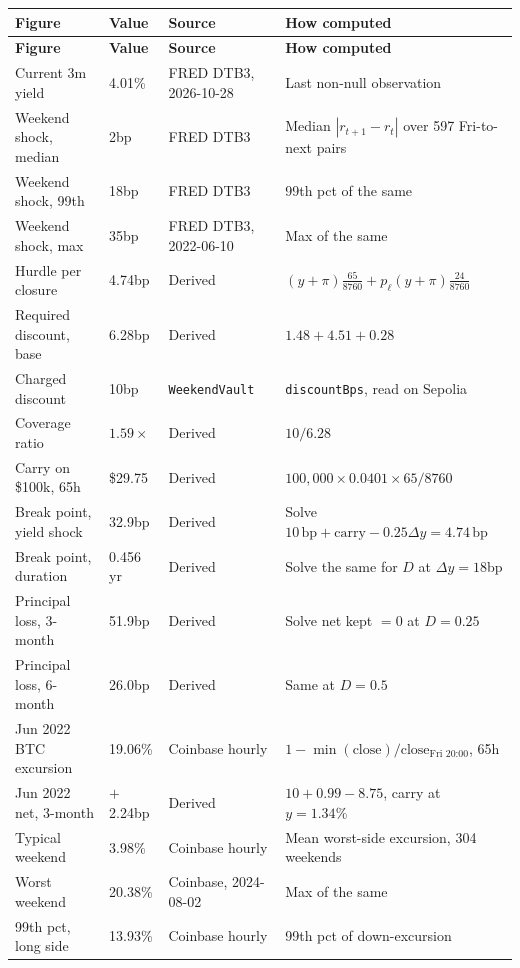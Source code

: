 \documentclass[11pt,a4paper]{article}
\newcommand{\bp}{\,\text{bp}}
\begin{document}
\begin{center}
\footnotesize
\begin{longtable}{@{}p{4.4cm}p{1.8cm}p{3.1cm}p{5.4cm}@{}}
\toprule
\textbf{Figure} & \textbf{Value} & \textbf{Source} & \textbf{How computed} \\
\midrule
\endfirsthead
\toprule
\textbf{Figure} & \textbf{Value} & \textbf{Source} & \textbf{How computed} \\
\midrule
\endhead
Current 3m yield & 4.01\% & FRED DTB3, 2026-10-28 & Last non-null observation \\
Weekend shock, median & 2bp & FRED DTB3 & Median $|r_{t+1}-r_t|$ over 597 Fri-to-next pairs \\
Weekend shock, 99th & 18bp & FRED DTB3 & 99th pct of the same \\
Weekend shock, max & 35bp & FRED DTB3, 2022-06-10 & Max of the same \\
Hurdle per closure & 4.74bp & Derived & $(y+\pi)\tfrac{65}{8760}+p_\ell(y+\pi)\tfrac{24}{8760}$ \\
Required discount, base & 6.28bp & Derived & $1.48+4.51+0.28$ \\
Charged discount & 10bp & \texttt{WeekendVault} & \texttt{discountBps}, read on Sepolia \\
Coverage ratio & $1.59\times$ & Derived & $10/6.28$ \\
Carry on \$100k, 65h & \$29.75 & Derived & $100{,}000\times0.0401\times65/8760$ \\
Break point, yield shock & 32.9bp & Derived & Solve $10\bp+\text{carry}-0.25\Delta y=4.74\bp$ \\
Break point, duration & 0.456 yr & Derived & Solve the same for $D$ at $\Delta y=18$bp \\
Principal loss, 3-month & 51.9bp & Derived & Solve net kept ${}=0$ at $D=0.25$ \\
Principal loss, 6-month & 26.0bp & Derived & Same at $D=0.5$ \\
Jun 2022 BTC excursion & 19.06\% & Coinbase hourly & $1-\min(\text{close})/\text{close}_{\text{Fri 20:00}}$, 65h \\
Jun 2022 net, 3-month & $+$2.24bp & Derived & $10+0.99-8.75$, carry at $y=1.34\%$ \\
Typical weekend & 3.98\% & Coinbase hourly & Mean worst-side excursion, 304 weekends \\
Worst weekend & 20.38\% & Coinbase, 2024-08-02 & Max of the same \\
99th pct, long side & 13.93\% & Coinbase hourly & 99th pct of down-excursion \\

\end{longtable}
\end{center}
\end{document}
